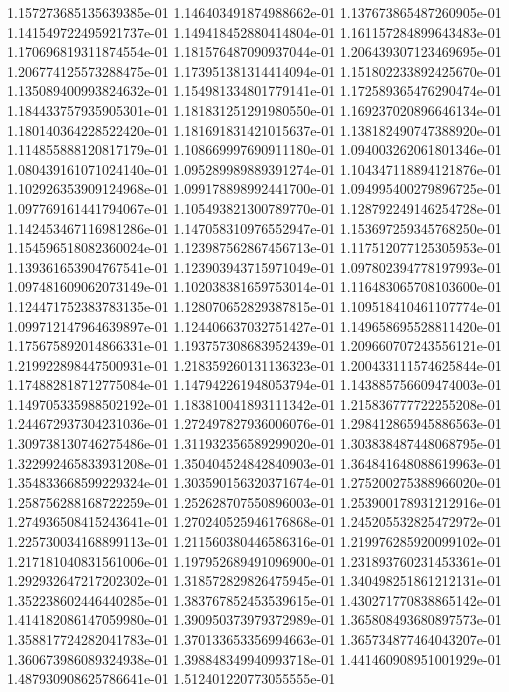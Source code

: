 1.157273685135639385e-01
1.146403491874988662e-01
1.137673865487260905e-01
1.141549722495921737e-01
1.149418452880414804e-01
1.161157284899643483e-01
1.170696819311874554e-01
1.181576487090937044e-01
1.206439307123469695e-01
1.206774125573288475e-01
1.173951381314414094e-01
1.151802233892425670e-01
1.135089400993824632e-01
1.154981334801779141e-01
1.172589365476290474e-01
1.184433757935905301e-01
1.181831251291980550e-01
1.169237020896646134e-01
1.180140364228522420e-01
1.181691831421015637e-01
1.138182490747388920e-01
1.114855888120817179e-01
1.108669997690911180e-01
1.094003262061801346e-01
1.080439161071024140e-01
1.095289989889391274e-01
1.104347118894121876e-01
1.102926353909124968e-01
1.099178898992441700e-01
1.094995400279896725e-01
1.097769161441794067e-01
1.105493821300789770e-01
1.128792249146254728e-01
1.142453467116981286e-01
1.147058310976552947e-01
1.153697259345768250e-01
1.154596518082360024e-01
1.123987562867456713e-01
1.117512077125305953e-01
1.139361653904767541e-01
1.123903943715971049e-01
1.097802394778197993e-01
1.097481609062073149e-01
1.102038381659753014e-01
1.116483065708103600e-01
1.124471752383783135e-01
1.128070652829387815e-01
1.109518410461107774e-01
1.099712147964639897e-01
1.124406637032751427e-01
1.149658695528811420e-01
1.175675892014866331e-01
1.193757308683952439e-01
1.209660707243556121e-01
1.219922898447500931e-01
1.218359260131136323e-01
1.200433111574625844e-01
1.174882818712775084e-01
1.147942261948053794e-01
1.143885756609474003e-01
1.149705335988502192e-01
1.183810041893111342e-01
1.215836777722255208e-01
1.244672937304231036e-01
1.272497827936006076e-01
1.298412865945886563e-01
1.309738130746275486e-01
1.311932356589299020e-01
1.303838487448068795e-01
1.322992465833931208e-01
1.350404524842840903e-01
1.364841648088619963e-01
1.354833668599229324e-01
1.303590156320371674e-01
1.275200275388966020e-01
1.258756288168722259e-01
1.252628707550896003e-01
1.253900178931212916e-01
1.274936508415243641e-01
1.270240525946176868e-01
1.245205532825472972e-01
1.225730034168899113e-01
1.211560380446586316e-01
1.219976285920099102e-01
1.217181040831561006e-01
1.197952689491096900e-01
1.231893760231453361e-01
1.292932647217202302e-01
1.318572829826475945e-01
1.340498251861212131e-01
1.352238602446440285e-01
1.383767852453539615e-01
1.430271770838865142e-01
1.414182086147059980e-01
1.390950373979372989e-01
1.365808493680897573e-01
1.358817724282041783e-01
1.370133653356994663e-01
1.365734877464043207e-01
1.360673986089324938e-01
1.398848349940993718e-01
1.441460908951001929e-01
1.487930908625786641e-01
1.512401220773055555e-01
